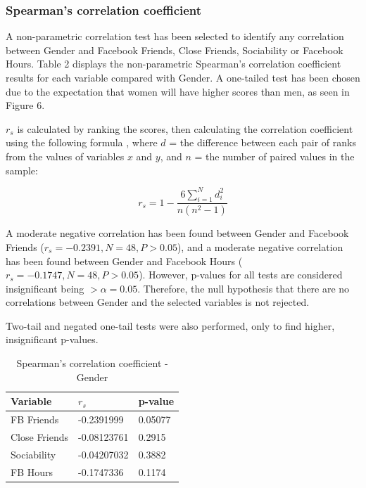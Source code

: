 \subsubsection{Spearman's correlation coefficient}

A non-parametric correlation test has been selected to identify any correlation between Gender and Facebook Friends, Close Friends, Sociability or Facebook Hours. Table 2 displays the non-parametric Spearman's correlation coefficient results for each variable compared with Gender. A one-tailed test has been chosen due to the expectation that women will have higher scores than men, as seen in Figure 6. 

$r_s$ is calculated by ranking the scores, then calculating the correlation coefficient using the following formula \citep[p. 359]{Gauthier2001}, where $d$ = the difference between each pair of ranks from the values of variables $x$ and $y$, and $n$ = the number of paired values in the sample:

$$r_s = 1 - \frac{6\sum_{i=1}^Nd_i^2}{n(n^2-1)}$$\linebreak

A moderate negative correlation has been found between Gender and Facebook Friends ($r_s = -0.2391, N = 48, P > 0.05$), and a moderate negative correlation has been found between Gender and Facebook Hours ($r_s = -0.1747, N = 48, P > 0.05$). However, p-values for all tests are considered insignificant  being $> \alpha = 0.05$. Therefore, the null hypothesis that there are no correlations between Gender and the selected variables is not rejected.



Two-tail and negated one-tail tests were also performed, only to find higher, insignificant p-values.

\begin{table}[H]
\centering
\caption{Spearman's correlation coefficient - Gender}
\begin{tabular}{l|l|l}
Variable      & $r_s$      & p-value \\ \hline
FB Friends    & -0.2391999  & 0.05077 \\ \hline
Close Friends & -0.08123761 & 0.2915  \\ \hline
Sociability   & -0.04207032 & 0.3882  \\ \hline
FB Hours      & -0.1747336  & 0.1174  \\ \hline
\end{tabular}
\end{table}

